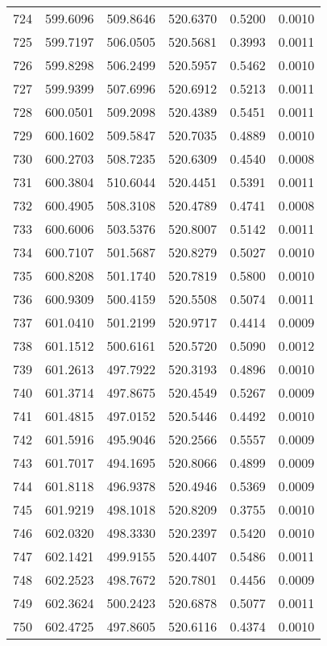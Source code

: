 \documentclass{article}
\begin{document}
\begin{longtable}{|c|c|c|c|c|c|}
724 & 599.6096 & 509.8646 & 520.6370 & 0.5200 & 0.0010 \\
725 & 599.7197 & 506.0505 & 520.5681 & 0.3993 & 0.0011 \\
726 & 599.8298 & 506.2499 & 520.5957 & 0.5462 & 0.0010 \\
727 & 599.9399 & 507.6996 & 520.6912 & 0.5213 & 0.0011 \\
728 & 600.0501 & 509.2098 & 520.4389 & 0.5451 & 0.0011 \\
729 & 600.1602 & 509.5847 & 520.7035 & 0.4889 & 0.0010 \\
730 & 600.2703 & 508.7235 & 520.6309 & 0.4540 & 0.0008 \\
731 & 600.3804 & 510.6044 & 520.4451 & 0.5391 & 0.0011 \\
732 & 600.4905 & 508.3108 & 520.4789 & 0.4741 & 0.0008 \\
733 & 600.6006 & 503.5376 & 520.8007 & 0.5142 & 0.0011 \\
734 & 600.7107 & 501.5687 & 520.8279 & 0.5027 & 0.0010 \\
735 & 600.8208 & 501.1740 & 520.7819 & 0.5800 & 0.0010 \\
736 & 600.9309 & 500.4159 & 520.5508 & 0.5074 & 0.0011 \\
737 & 601.0410 & 501.2199 & 520.9717 & 0.4414 & 0.0009 \\
738 & 601.1512 & 500.6161 & 520.5720 & 0.5090 & 0.0012 \\
739 & 601.2613 & 497.7922 & 520.3193 & 0.4896 & 0.0010 \\
740 & 601.3714 & 497.8675 & 520.4549 & 0.5267 & 0.0009 \\
741 & 601.4815 & 497.0152 & 520.5446 & 0.4492 & 0.0010 \\
742 & 601.5916 & 495.9046 & 520.2566 & 0.5557 & 0.0009 \\
743 & 601.7017 & 494.1695 & 520.8066 & 0.4899 & 0.0009 \\
744 & 601.8118 & 496.9378 & 520.4946 & 0.5369 & 0.0009 \\
745 & 601.9219 & 498.1018 & 520.8209 & 0.3755 & 0.0010 \\
746 & 602.0320 & 498.3330 & 520.2397 & 0.5420 & 0.0010 \\
747 & 602.1421 & 499.9155 & 520.4407 & 0.5486 & 0.0011 \\
748 & 602.2523 & 498.7672 & 520.7801 & 0.4456 & 0.0009 \\
749 & 602.3624 & 500.2423 & 520.6878 & 0.5077 & 0.0011 \\
750 & 602.4725 & 497.8605 & 520.6116 & 0.4374 & 0.0010 \\

\end{longtable}
\end{document}
